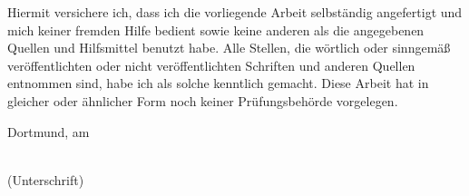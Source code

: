 
Hiermit versichere ich, dass ich die vorliegende Arbeit selbständig angefertigt und mich keiner fremden Hilfe bedient sowie keine anderen als die angegebenen Quellen und Hilfsmittel benutzt habe. Alle Stellen, die wörtlich oder sinngemäß veröffentlichten oder nicht veröffentlichten Schriften und anderen Quellen entnommen sind, habe ich als solche kenntlich gemacht. Diese Arbeit hat in gleicher oder ähnlicher Form noch keiner Prüfungsbehörde vorgelegen.

\vspace{4cm}
		
\noindent
\begin{minipage}[h]{0.4\linewidth}
	Dortmund, am \dotfill\\
	\vspace*{2.5mm}
\end{minipage}
	\hspace*{0.1\linewidth}
	\begin{minipage}[h]{0.5\linewidth}
	\begin{center}
		\dotfill\\
		(Unterschrift)
	\end{center}
\end{minipage}
